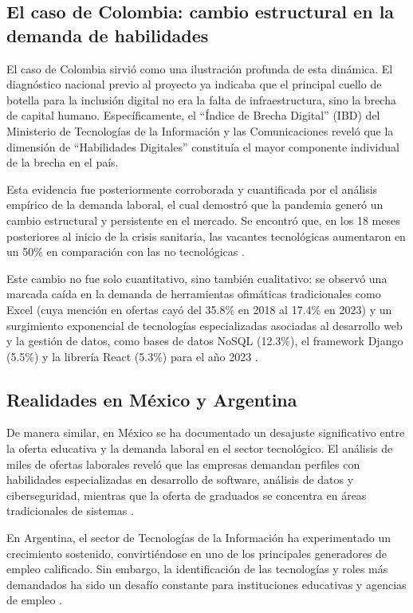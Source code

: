 \subsection{El caso de Colombia: cambio estructural en la demanda de habilidades}

El caso de Colombia sirvió como una ilustración profunda de esta dinámica. El diagnóstico nacional previo al proyecto ya indicaba que el principal cuello de botella para la inclusión digital no era la falta de infraestructura, sino la brecha de capital humano. Específicamente, el ``Índice de Brecha Digital'' (IBD) del Ministerio de Tecnologías de la Información y las Comunicaciones reveló que la dimensión de ``Habilidades Digitales'' constituía el mayor componente individual de la brecha en el país.

Esta evidencia fue posteriormente corroborada y cuantificada por el análisis empírico de la demanda laboral, el cual demostró que la pandemia generó un cambio estructural y persistente en el mercado. Se encontró que, en los 18 meses posteriores al inicio de la crisis sanitaria, las vacantes tecnológicas aumentaron en un 50\% en comparación con las no tecnológicas \parencite{rubio2024}.

Este cambio no fue solo cuantitativo, sino también cualitativo: se observó una marcada caída en la demanda de herramientas ofimáticas tradicionales como Excel (cuya mención en ofertas cayó del 35.8\% en 2018 al 17.4\% en 2023) y un surgimiento exponencial de tecnologías especializadas asociadas al desarrollo web y la gestión de datos, como bases de datos NoSQL (12.3\%), el framework Django (5.5\%) y la librería React (5.3\%) para el año 2023 \parencite{rubio2024}.

\subsection{Realidades en México y Argentina}

De manera similar, en México se ha documentado un desajuste significativo entre la oferta educativa y la demanda laboral en el sector tecnológico. El análisis de miles de ofertas laborales reveló que las empresas demandan perfiles con habilidades especializadas en desarrollo de software, análisis de datos y ciberseguridad, mientras que la oferta de graduados se concentra en áreas tradicionales de sistemas \parencite{martinez2024}.

En Argentina, el sector de Tecnologías de la Información ha experimentado un crecimiento sostenido, convirtiéndose en uno de los principales generadores de empleo calificado. Sin embargo, la identificación de las tecnologías y roles más demandados ha sido un desafío constante para instituciones educativas y agencias de empleo \parencite{aguilera2018}.

